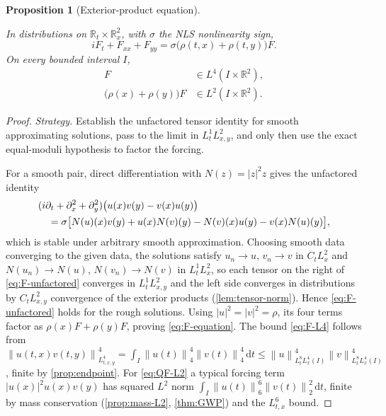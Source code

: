 \documentclass[11pt,oneside]{book}
\providecommand{\uses}[1]{}
\newtheorem{proposition}[theorem]{Proposition}
\theoremstyle{definition}
\theoremstyle{remark}
\newcommand{\R}{\mathbb R}
\newcommand{\1}{\mathbf 1}
\newcommand{\dd}{\,\mathrm d}
\newcommand{\norm}[1]{\left\lVert #1\right\rVert}
\begin{document}
\begin{proposition}[Exterior-product equation]\label{prop:F-equation}
\uses{def:exterior-product, cor:diagonal-W}
In distributions on $\R_t\times\R_x^2$, with $\sigma$ the NLS nonlinearity
sign,
\begin{equation}
 iF_t+F_{xx}+F_{yy}
 =\sigma\bigl(\rho(t,x)+\rho(t,y)\bigr)F.            \label{eq:F-equation}
\end{equation}
On every bounded interval $I$,
\begin{align}
 F&\in L^4(I\times\R^2),                             \label{eq:F-L4}\\
 \bigl(\rho(x)+\rho(y)\bigr)F&\in L^2(I\times\R^2).  \label{eq:QF-L2}
\end{align}
\end{proposition}

\begin{proof}
\uses{lem:tensor-norm, prop:endpoint, prop:mass-L2, thm:GWP}
\emph{Strategy.} Establish the unfactored tensor identity for smooth
approximating solutions, pass to the limit in $L^1_tL^2_{x,y}$, and only
then use the exact equal-moduli hypothesis to factor the forcing.

For a smooth pair, direct differentiation with $N(z)=|z|^2z$ gives the
unfactored identity
\begin{align}
 &(i\partial_t+\partial_x^2+\partial_y^2)\bigl(u(x)v(y)-v(x)u(y)\bigr)\notag\\
 &\quad=\sigma\bigl[N(u)(x)v(y)+u(x)N(v)(y)-N(v)(x)u(y)-v(x)N(u)(y)\bigr],
                                                     \label{eq:F-unfactored}
\end{align}
which is stable under arbitrary smooth approximation. Choosing smooth data
converging to the given data, the solutions satisfy $u_n\to u$, $v_n\to v$
in $C_tL^2_x$ and $N(u_n)\to N(u)$, $N(v_n)\to N(v)$ in $L^1_tL^2_x$, so each
tensor on the right of \eqref{eq:F-unfactored} converges in
$L^1_tL^2_{x,y}$ and the left side converges in distributions by
$C_tL^2_{x,y}$ convergence of the exterior products (\cref{lem:tensor-norm}).
Hence \eqref{eq:F-unfactored} holds for the rough solutions. Using
$|u|^2=|v|^2=\rho$, its four terms factor as
$\rho(x)F+\rho(y)F$, proving \eqref{eq:F-equation}. The bound
\eqref{eq:F-L4} follows from
$\norm{u(t,x)v(t,y)}_{L^4_{t,x,y}}^4=\int_I\norm{u(t)}_4^4\norm{v(t)}_4^4\dd t
\le\norm u_{L^8_tL^4_x(I)}^4\norm v_{L^8_tL^4_x(I)}^4$, finite by
\cref{prop:endpoint}. For \eqref{eq:QF-L2} a typical forcing term
$|u(x)|^2u(x)v(y)$ has squared $L^2$ norm
$\int_I\norm{u(t)}_6^6\norm{v(t)}_2^2\dd t$, finite by mass conservation
(\cref{prop:mass-L2}, \cref{thm:GWP}) and the $L^6_{t,x}$ bound.
\end{proof}
\end{document}
